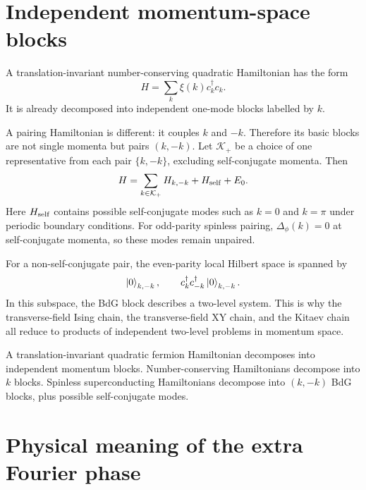 \section{Independent momentum-space blocks}

A translation-invariant number-conserving quadratic Hamiltonian has the form
\begin{equation}
    H=\sum_k\xi(k)c_k^\dagger c_k.
\end{equation}
It is already decomposed into independent one-mode blocks labelled by $k$.

A pairing Hamiltonian is different: it couples $k$ and $-k$.  Therefore its basic
blocks are not single momenta but pairs $(k,-k)$.  Let $\mathcal{K}_+$ be a choice
of one representative from each pair $\{k,-k\}$, excluding self-conjugate momenta.
Then
\begin{equation}
\label{eq:paired-momentum-block-decomposition}
    H
    =
    \sum_{k\in\mathcal{K}_+}H_{k,-k}
    +H_{\rm self}
    +E_0.
\end{equation}
Here $H_{\rm self}$ contains possible self-conjugate modes such as $k=0$ and
$k=\pi$ under periodic boundary conditions.  For odd-parity spinless pairing,
$\Delta_\phi(k)=0$ at self-conjugate momenta, so these modes remain unpaired.

For a non-self-conjugate pair, the even-parity local Hilbert space is spanned by
\begin{equation}
    \left|0\right\rangle_{k,-k},
    \qquad
    c_k^\dagger c_{-k}^\dagger\left|0\right\rangle_{k,-k}.
\end{equation}
In this subspace, the BdG block describes a two-level system.  This is why the
transverse-field Ising chain, the transverse-field XY chain, and the Kitaev chain
all reduce to products of independent two-level problems in momentum space.

\begin{principle}
A translation-invariant quadratic fermion Hamiltonian decomposes into independent
momentum blocks.  Number-conserving Hamiltonians decompose into $k$ blocks.
Spinless superconducting Hamiltonians decompose into $(k,-k)$ BdG blocks, plus
possible self-conjugate modes.
\end{principle}

\section{Physical meaning of the extra Fourier phase}

